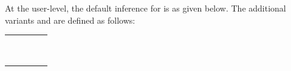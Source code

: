 \begin{isabellebody}
\begin{isamarkuptext}
  At the user-level, the default inference for \hyperlink{command.assume}{\mbox{}} is
  \hyperlink{inference.discharge}{\mbox{}} as given below.  The additional variants
  \hyperlink{command.presume}{\mbox{}} and \hyperlink{command.def}{\mbox{}} are defined as follows:

  \medskip
  \begin{tabular}{rcl}
    \hyperlink{command.presume}{\mbox{\isa{\isacommand{presume}}}}~\isa{A} & \isa{{\isaliteral{22}{\isachardoublequote}}{\isaliteral{5C3C65717569763E}{\isasymequiv}}{\isaliteral{22}{\isachardoublequote}}} & \hyperlink{command.assume}{\mbox{\isa{\isacommand{assume}}}}~\isa{{\isaliteral{22}{\isachardoublequote}}{\isaliteral{5C3C6775696C6C656D6F746C6566743E}{\isasymguillemotleft}}weak{\isaliteral{5C3C646173683E}{\isasymdash}}discharge{\isaliteral{5C3C6775696C6C656D6F7472696768743E}{\isasymguillemotright}}\ A{\isaliteral{22}{\isachardoublequote}}} \\
    \hyperlink{command.def}{\mbox{\isa{\isacommand{def}}}}~\isa{{\isaliteral{22}{\isachardoublequote}}x\ {\isaliteral{5C3C65717569763E}{\isasymequiv}}\ a{\isaliteral{22}{\isachardoublequote}}} & \isa{{\isaliteral{22}{\isachardoublequote}}{\isaliteral{5C3C65717569763E}{\isasymequiv}}{\isaliteral{22}{\isachardoublequote}}} & \hyperlink{command.fix}{\mbox{\isa{\isacommand{fix}}}}~\isa{x}~\hyperlink{command.assume}{\mbox{\isa{\isacommand{assume}}}}~\isa{{\isaliteral{22}{\isachardoublequote}}{\isaliteral{5C3C6775696C6C656D6F746C6566743E}{\isasymguillemotleft}}expansion{\isaliteral{5C3C6775696C6C656D6F7472696768743E}{\isasymguillemotright}}\ x\ {\isaliteral{5C3C65717569763E}{\isasymequiv}}\ a{\isaliteral{22}{\isachardoublequote}}} \\
  \end{tabular}
  \medskip


\end{isamarkuptext}
\end{isabellebody}
